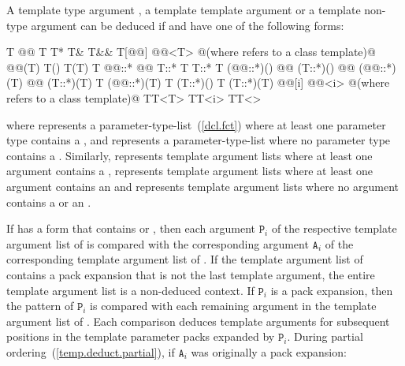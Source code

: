 \pnum
A template type argument
,
a template template argument
or a template non-type argument
can be deduced if
and
have one of the following forms:

\begin{codeblock}
T
@@ T
T*
T&
T&&
T[@@]
@@<T>  @\textrm{(where  refers to a class template)}@
@@(T)
T()
T(T)
T @@::*
@@ T::*
T T::*
T (@@::*)()
@@ (T::*)()
@@ (@@::*)(T)
@@ (T::*)(T)
T (@@::*)(T)
T (T::*)()
T (T::*)(T)
@@[i]
@@<i>  @\textrm{(where  refers to a class template)}@
TT<T>
TT<i>
TT<>
\end{codeblock}

where
represents
a parameter-type-list~(\ref{dcl.fct})
where at least one parameter type contains a
,
and
\tcode{()}
represents
a parameter-type-list
where no parameter type contains a
.
Similarly,
represents template argument lists where at least one argument contains a
,
represents template argument lists where at least one argument contains an
and
\tcode{<>}
represents template argument lists where no argument contains a
or an
.

\pnum
If  has a form that contains 
or , then each argument $\mathtt{P}_i$ of the
respective template argument list of  is compared with the
corresponding argument $\mathtt{A}_i$ of the corresponding
template argument list of . If the template argument list
of  contains a pack expansion that is not the last
template argument, the entire template argument list is a non-deduced
context. If $\texttt{P}_i$ is a pack expansion, then the pattern
of $\texttt{P}_i$ is compared with each remaining argument in the
template argument list of . Each comparison deduces
template arguments for subsequent positions in the template parameter
packs expanded by $\texttt{P}_i$.
During partial ordering~(\ref{temp.deduct.partial}), if $\texttt{A}_i$ was
originally a pack expansion:

